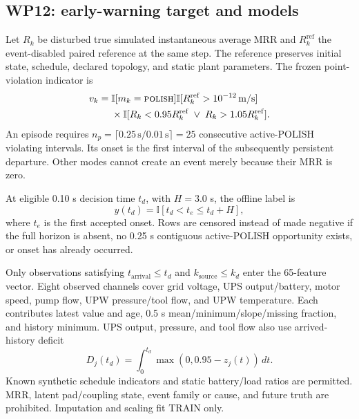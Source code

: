 \documentclass[10pt,twocolumn]{article}
\begin{document}
\subsection{WP12: early-warning target and models}

Let $R_k$ be disturbed true simulated instantaneous average MRR and
$R_k^{\mathrm{ref}}$ the event-disabled paired reference at the same step. The
reference preserves initial state, schedule, declared topology, and static
plant parameters. The frozen point-violation indicator is
\begin{equation}
\begin{aligned}
v_k={}&\mathbb I[m_k=\textsc{polish}]
\mathbb I[R_k^{\mathrm{ref}}>10^{-12}\,\mathrm{m/s}]\\
&\times\mathbb I[R_k<0.95R_k^{\mathrm{ref}}
\;\lor\;R_k>1.05R_k^{\mathrm{ref}}].
\end{aligned}
\label{eq:warning-violation}
\end{equation}
An episode requires
$n_p=\lceil0.25\,\mathrm{s}/0.01\,\mathrm{s}\rceil=25$ consecutive
active-POLISH violating intervals. Its onset is the first interval of the
subsequently persistent departure. Other modes cannot create an event merely
because their MRR is zero.

At eligible 0.10 s decision time $t_d$, with $H=3.0$ s, the offline label is
\begin{equation}
y(t_d)=\mathbb I[t_d<t_e\leq t_d+H],
\label{eq:warning-target}
\end{equation}
where $t_e$ is the first accepted onset. Rows are censored instead of made
negative if the full horizon is absent, no 0.25 s contiguous active-POLISH
opportunity exists, or onset has already occurred.

Only observations satisfying $t_{\mathrm{arrival}}\leq t_d$ and
$k_{\mathrm{source}}\leq k_d$ enter the 65-feature vector. Eight observed
channels cover grid voltage, UPS output/battery, motor speed, pump flow, UPW
pressure/tool flow, and UPW temperature. Each contributes latest value and
age, 0.5 s mean/minimum/slope/missing fraction, and history minimum. UPS
output, pressure, and tool flow also use arrived-history deficit
\begin{equation}
D_j(t_d)=\int_0^{t_d}\max(0,0.95-z_j(t))\,dt.
\label{eq:warning-deficit}
\end{equation}
Known synthetic schedule indicators and static battery/load ratios are
permitted. MRR, latent pad/coupling state, event family or cause, and future
truth are prohibited. Imputation and scaling fit TRAIN only.
\end{document}
